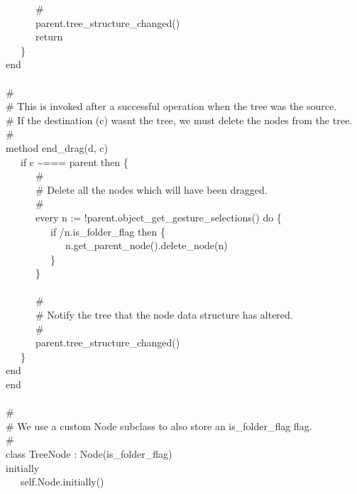 {\>   \ \ \ \ \ \ \# \\
\>   \ \ \ \ \ \ parent.tree\_structure\_changed() \\
\>   \ \ \ \ \ \ return \\
\>   \ \ \ \} \\
\>   end \\
\ \\
\>   \# \\
\>   \# This is invoked after a successful operation when the tree was the source.\\
\>   \# If the destination (c) wasn{\textquotesingle}t the tree, we must delete the nodes from the tree. \\
\>   \# \\
\>   method end\_drag(d, c) \\
\>   \ \ \ if c \~{}=== parent then \{ \\
\>   \ \ \ \ \ \ \# \\
\>   \ \ \ \ \ \ \# Delete all the nodes which will have been dragged. \\
\>   \ \ \ \ \ \ \# \\
\>   \ \ \ \ \ \ every n := !parent.object\_get\_gesture\_selections()
do \{ \\
\>   \ \ \ \ \ \ \ \ \ if /n.is\_folder\_flag then \{ \\
\>   \ \ \ \ \ \ \ \ \ \ \ \ n.get\_parent\_node().delete\_node(n) \\
\>   \ \ \ \ \ \ \ \ \ \} \\
\>   \ \ \ \ \ \ \} \\
\ \\
\>   \ \ \ \ \ \ \# \\
\>   \ \ \ \ \ \ \# Notify the tree that the node data structure has altered. \\
\>   \ \ \ \ \ \ \# \\
\>   \ \ \ \ \ \ parent.tree\_structure\_changed() \\
\>   \ \ \ \} \\
\>   end \\
end \\
\ \\
\# \\
\# We use a custom Node subclass to also store an
{\textquotedbl}is\_folder\_flag{\textquotedbl} flag. \\
\# \\
class TreeNode : Node(is\_folder\_flag) \\
\>   initially \\
\>   \ \ \ self.Node.initially() \\
}
